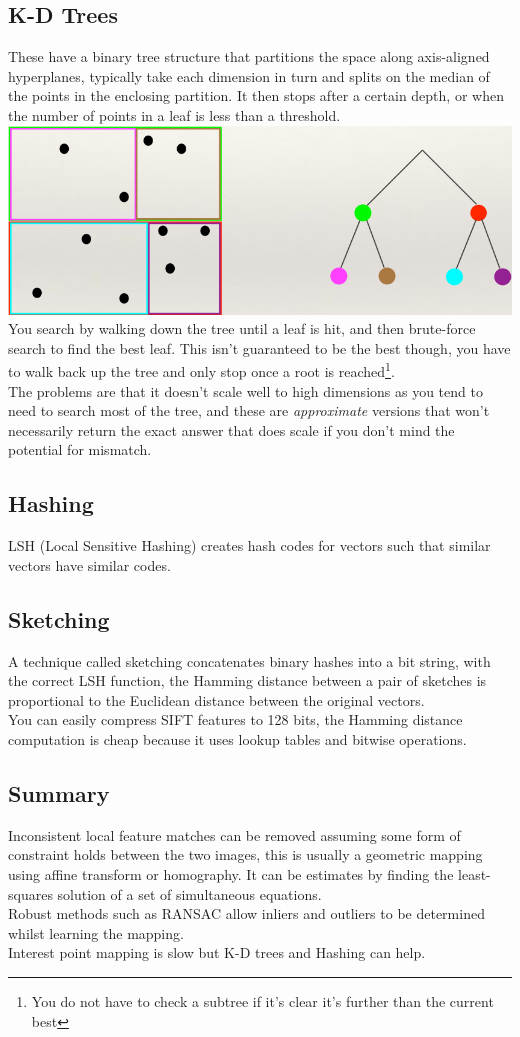 \documentclass{article}
\begin{document}
	\subsection{K-D Trees}
	These have a binary tree structure that partitions the space along axis-aligned hyperplanes, typically take each dimension in turn and splits on the median of the points in the enclosing partition. It then stops after a certain depth, or when the number of points in a leaf is less than a threshold.\\
	\includegraphics[width=\linewidth]{kd}
	You search by walking down the tree until a leaf is hit, and then brute-force search to find the best leaf. This isn't guaranteed to be the best though, you have to walk back up the tree and only stop once a root is reached\footnote{You do not have to check a subtree if it's clear it's further than the current best}.\\
	The problems are that it doesn't scale well to high dimensions as you tend to need to search most of the tree, and these are \textit{approximate} versions that won't necessarily return the exact answer that does scale if you don't mind the potential for mismatch.
	\subsection{Hashing}
	LSH (Local Sensitive Hashing) creates hash codes for vectors such that similar vectors have similar codes.
	\subsection{Sketching}
	A technique called sketching concatenates binary hashes into a bit string, with the correct LSH function, the Hamming distance between a pair of sketches is proportional to the Euclidean distance between the original vectors.\\
	You can easily compress SIFT features to 128 bits, the Hamming distance computation is cheap because it uses lookup tables and bitwise operations.
	\subsection{Summary}
	Inconsistent local feature matches can be removed assuming some form of constraint holds between the two images, this is usually a geometric mapping using affine transform or homography. It can be estimates by finding the least-squares solution of a set of simultaneous equations.\\
	Robust methods such as RANSAC allow inliers and outliers to be determined whilst learning the mapping.\\
	Interest point mapping is slow but K-D trees and Hashing can help.
\end{document}

